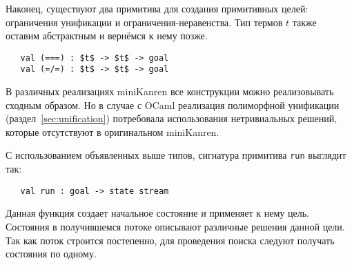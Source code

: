 
Наконец, существуют два примитива для создания примитивных целей: ограничения унификации и ограничения-неравенства. Тип термов  $t$  также оставим абстрактным и вернёмся к нему позже.

\begin{lstlisting}
   val (===) : $t$ -> $t$ -> goal
   val (=/=) : $t$ -> $t$ -> goal
\end{lstlisting}


\noindent В различных реализациях miniKanren все конструкции можно реализовывать сходным образом.
Но в случае с OCaml реализация полиморфной унификации (раздел~\ref{sec:unification}) потребовала использования нетривиальных решений, которые отсутствуют в оригинальном miniKanren.


С использованием объявленных выше типов, сигнатура примитива \lstinline|run| выглядит так:

\begin{lstlisting}
   val run : goal -> state stream
\end{lstlisting}

\noindent Данная функция создает начальное состояние и применяет к нему цель. Состояния в получившемся потоке описывают различные решения данной цели.
Так как поток строится постепенно, для проведения поиска следуют получать состояния по одному.

